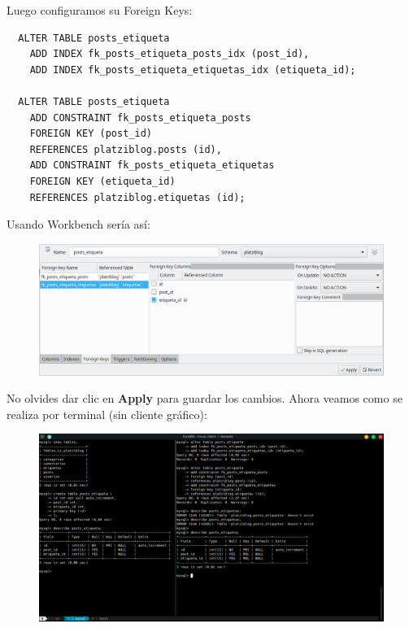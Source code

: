 \documentclass{article}
\begin{document}
\newpage

Luego configuramos su Foreign Keys:

\begin{verbatim}
  ALTER TABLE posts_etiqueta
    ADD INDEX fk_posts_etiqueta_posts_idx (post_id),
    ADD INDEX fk_posts_etiqueta_etiquetas_idx (etiqueta_id);

  ALTER TABLE posts_etiqueta
    ADD CONSTRAINT fk_posts_etiqueta_posts
    FOREIGN KEY (post_id)
    REFERENCES platziblog.posts (id),
    ADD CONSTRAINT fk_posts_etiqueta_etiquetas
    FOREIGN KEY (etiqueta_id)
    REFERENCES platziblog.etiquetas (id);
\end{verbatim}

Usando Workbench sería así:\\

\begin{figure}[h!]
  \centering
  \includegraphics[scale=0.55]{./Pictures/074_fk_pe_posts.png}
\end{figure}

No olvides dar clic en \textbf{Apply} para guardar los cambios. Ahora veamos
como se realiza por terminal (sin cliente gráfico):\\

\begin{figure}[h!]
  \centering
  \includegraphics[scale=0.5]{./Pictures/155_platziblog_t_transitiva.png}
\end{figure}
\end{document}
